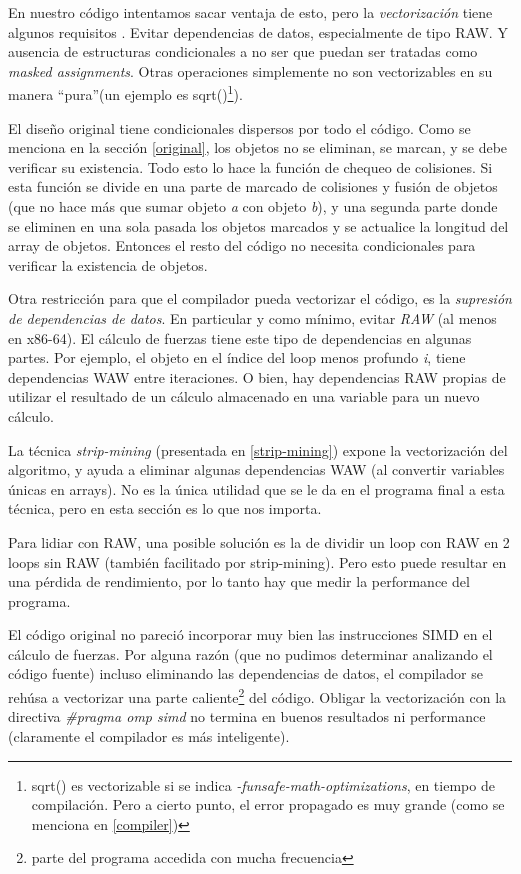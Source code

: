 \documentclass{article}
\begin{document}
En nuestro código intentamos sacar ventaja de esto, pero la \textit{vectorización} tiene algunos requisitos \cite{intel_vec_guidelines}.
Evitar dependencias de datos, especialmente de tipo RAW. Y ausencia de estructuras condicionales a no ser
que puedan ser tratadas como \textit{masked assignments}. Otras operaciones simplemente no son vectorizables
en su manera ``pura''(un ejemplo es sqrt()\footnote{sqrt() es vectorizable si se indica \textit{-funsafe-math-optimizations},
en tiempo de compilación. Pero a cierto punto, el error propagado es muy grande (como se menciona en \ref{compiler})}).


El diseño original tiene condicionales dispersos por todo el código. Como se menciona en
la sección \ref{original}, los objetos no se eliminan, se marcan, y se debe verificar su existencia.
Todo esto lo hace la función de chequeo de colisiones. Si esta función se divide en una parte de marcado
de colisiones y fusión de objetos (que no hace más que sumar objeto \textit{a} con objeto \textit{b}), y
una segunda parte donde se eliminen en una sola pasada los objetos marcados y se actualice la longitud
del array de objetos. Entonces el resto del código no necesita condicionales para verificar la existencia de objetos.


Otra restricción para que el compilador pueda vectorizar el código, es la \textit{supresión de dependencias de datos}.
En particular y como mínimo, evitar \textit{RAW} (al menos en x86-64). El cálculo de fuerzas tiene este tipo de dependencias en algunas
partes. Por ejemplo, el objeto en el índice del loop menos profundo \textit{i}, tiene dependencias WAW entre iteraciones.
O bien, hay dependencias RAW propias de utilizar el resultado de un cálculo almacenado en una variable para un nuevo cálculo.


La técnica \textit{strip-mining} (presentada en \ref{strip-mining}) expone la vectorización
del algoritmo, y ayuda a eliminar algunas dependencias WAW (al convertir variables únicas en arrays). No es
la única utilidad que se le da en el programa final a esta técnica, pero en esta sección es lo que nos importa.


Para lidiar con RAW, una posible solución es la de dividir un loop con RAW en 2 loops sin RAW (también
facilitado por strip-mining). Pero esto puede resultar en una pérdida de rendimiento, por lo tanto
hay que medir la performance del programa.


El código original no pareció incorporar muy bien las instrucciones SIMD en el cálculo de fuerzas.
Por alguna razón (que no pudimos determinar analizando el código fuente)
incluso eliminando las dependencias de datos, el compilador se rehúsa a vectorizar
una parte caliente\footnote{parte del programa accedida con mucha frecuencia} del código. Obligar la vectorización
con la directiva \textit{\#pragma omp simd} no termina en buenos resultados ni performance (claramente el compilador
es más inteligente).
\end{document}
